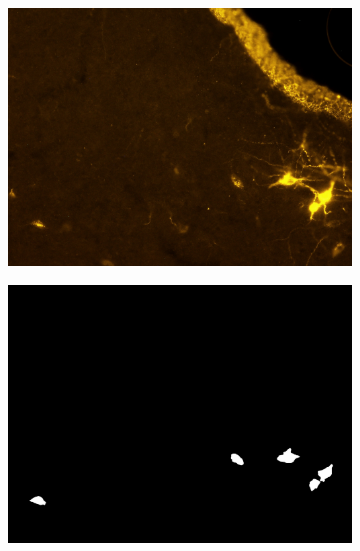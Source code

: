 \begin{figure}
\centering
\begin{subfigure}{0.55\textwidth}
\includegraphics[width=\linewidth]{figures/120_dataset/i_252.jpeg}
\subcaption{}
\end{subfigure}%
\begin{subfigure}{0.55\textwidth}
\includegraphics[width=\linewidth]{figures/120_dataset/m_252.jpeg}
\subcaption{}
\label{fig:artifacts:stripe}
\end{subfigure}%


\end{figure}
